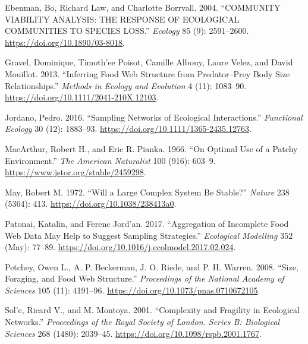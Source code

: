 \documentclass{article}
\newlength{\cslhangindent}
\newlength{\cslentryspacingunit} %
\newenvironment{CSLReferences}[2] %
 {%
  \setlength{\parindent}{0pt}
  \ifodd #1
  \let\oldpar\par
  \def\par{\hangindent=\cslhangindent\oldpar}
  \fi
  \setlength{\parskip}{#2\cslentryspacingunit}
 }%
 {}
\begin{document}
\begin{CSLReferences}{1}{0}
\leavevmode{}%
Ebenman, Bo, Richard Law, and Charlotte Borrvall. 2004. {``{COMMUNITY
VIABILITY ANALYSIS}: {THE RESPONSE OF ECOLOGICAL COMMUNITIES TO SPECIES
LOSS}.''} \emph{Ecology} 85 (9): 2591--2600.
\url{https://doi.org/10.1890/03-8018}.

\leavevmode{}%
Gravel, Dominique, Timoth'ee Poisot, Camille Albouy, Laure Velez, and
David Mouillot. 2013. {``Inferring Food Web Structure from
Predator--Prey Body Size Relationships.''} \emph{Methods in Ecology and
Evolution} 4 (11): 1083--90.
\url{https://doi.org/10.1111/2041-210X.12103}.

\leavevmode{}%
Jordano, Pedro. 2016. {``Sampling Networks of Ecological
Interactions.''} \emph{Functional Ecology} 30 (12): 1883--93.
\url{https://doi.org/10.1111/1365-2435.12763}.

\leavevmode{}%
MacArthur, Robert H., and Eric R. Pianka. 1966. {``On Optimal Use of a
Patchy Environment.''} \emph{The American Naturalist} 100 (916): 603--9.
\url{https://www.jstor.org/stable/2459298}.

\leavevmode{}%
May, Robert M. 1972. {``Will a {Large Complex System} Be {Stable}?''}
\emph{Nature} 238 (5364): 413. \url{https://doi.org/10.1038/238413a0}.

\leavevmode{}%
Patonai, Katalin, and Ferenc Jord'an. 2017. {``Aggregation of Incomplete
Food Web Data May Help to Suggest Sampling Strategies.''}
\emph{Ecological Modelling} 352 (May): 77--89.
\url{https://doi.org/10.1016/j.ecolmodel.2017.02.024}.

\leavevmode{}%
Petchey, Owen L., A. P. Beckerman, J. O. Riede, and P. H. Warren. 2008.
{``Size, Foraging, and Food Web Structure.''} \emph{Proceedings of the
National Academy of Sciences} 105 (11): 4191--96.
\url{https://doi.org/10.1073/pnas.0710672105}.

\leavevmode{}%
Sol'e, Ricard V., and M. Montoya. 2001. {``Complexity and Fragility in
Ecological Networks.''} \emph{Proceedings of the Royal Society of
London. Series B: Biological Sciences} 268 (1480): 2039--45.
\url{https://doi.org/10.1098/rspb.2001.1767}.


\end{CSLReferences}
\end{document}
